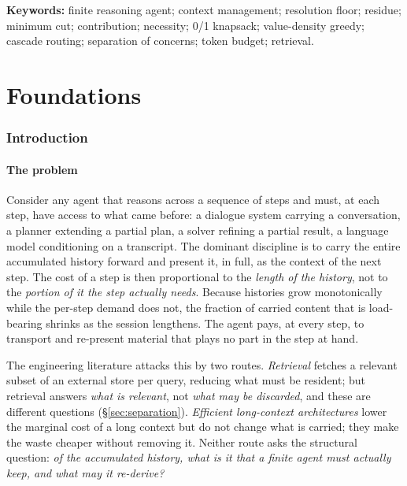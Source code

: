 \documentclass[11pt,a4paper]{article}
\theoremstyle{thmstyle}
\theoremstyle{definition}
\theoremstyle{remark}
\begin{document}
\vspace{4pt}
\noindent\textbf{Keywords:} finite reasoning agent; context management; resolution
floor; residue; minimum cut; contribution; necessity; 0/1 knapsack; value-density
greedy; cascade routing; separation of concerns; token budget; retrieval.

\tableofcontents

\part{Foundations}

\section{Introduction}
\label{sec:intro}

\subsection{The problem}

Consider any agent that reasons across a sequence of steps and must, at each
step, have access to what came before: a dialogue system carrying a
conversation, a planner extending a partial plan, a solver refining a partial
result, a language model conditioning on a transcript. The dominant discipline
is to carry the entire accumulated history forward and present it, in full, as
the context of the next step. The cost of a step is then proportional to the
\emph{length of the history}, not to the \emph{portion of it the step actually
needs}. Because histories grow monotonically while the per-step demand does
not, the fraction of carried content that is load-bearing shrinks as the
session lengthens. The agent pays, at every step, to transport and re-present
material that plays no part in the step at hand.

The engineering literature attacks this by two routes. \emph{Retrieval}
\citep{lewis2020} fetches a relevant subset of an external store per query,
reducing what must be resident; but retrieval answers \emph{what is relevant},
not \emph{what may be discarded}, and these are different questions
(\S\ref{sec:separation}). \emph{Efficient long-context architectures}
\citep{tay2022,vaswani2017} lower the marginal cost of a long context but do not
change what is carried; they make the waste cheaper without removing it. Neither
route asks the structural question: \emph{of the accumulated history, what is it
that a finite agent must actually keep, and what may it re-derive?}
\end{document}
